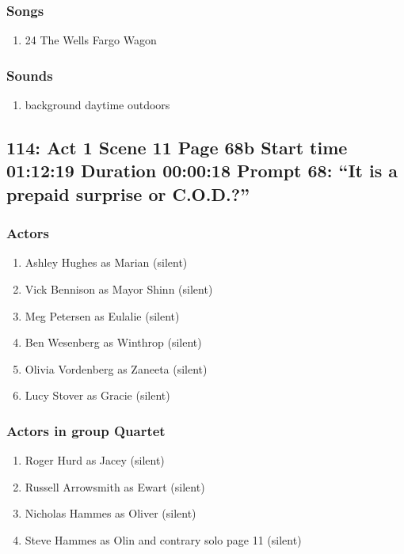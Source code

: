 \subsubsection{Songs}
\begin{enumerate}
\item 24 The Wells Fargo Wagon
\end{enumerate}\subsubsection{Sounds}
\begin{enumerate}
\item background daytime outdoors
\end{enumerate}
\subsection{114: Act 1 Scene 11 Page 68b Start time 01:12:19 Duration 00:00:18 Prompt 68: ``It is a prepaid surprise or C.O.D.?''}

\subsubsection{Actors}
\begin{enumerate}
\item Ashley Hughes as Marian (silent)
\item Vick Bennison as Mayor Shinn (silent)
\item Meg Petersen as Eulalie (silent)
\item Ben Wesenberg as Winthrop (silent)
\item Olivia Vordenberg as Zaneeta (silent)
\item Lucy Stover as Gracie (silent)
\end{enumerate}
\subsubsection{Actors in group Quartet}
\begin{enumerate}
\item Roger Hurd as Jacey (silent)
\item Russell Arrowsmith as Ewart (silent)
\item Nicholas Hammes as Oliver (silent)
\item Steve Hammes as Olin and contrary solo page 11 (silent)
\end{enumerate}
